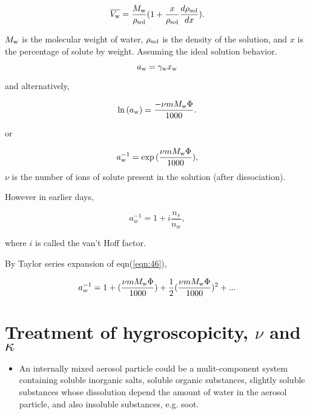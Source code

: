 \documentclass[12pt]{article}
\begin{document}
{\begin{equation}
\overline{V_{\rm w}}=\frac{ M_{\rm w}}{\rho_{\rm sol}} (1 + \frac{x}{\rho_{\rm sol}} \frac{d \rho_{\rm sol}}{dx}).
\end{equation}

$M_{\rm w}$ is the molecular weight of water, $\rho_{\rm sol}$ is the density of the solution, and $x$ is the percentage of solute by weight. Assuming the ideal solution behavior.

\begin{equation}
a_{\rm w}=\gamma_{\rm w} x_{\rm w}
\end{equation}

and alternatively, 

\begin{equation}
\ln {(a_{\rm w})}=\frac{- \nu m M_{\rm w} \Phi }{1000}.
\end{equation}

or 

\begin{equation}\label{eqn:46}
a_{\rm w}^{-1}=\exp{(\frac{\nu m M_{\rm w} \Phi }{1000})},
\end{equation}
$\nu$ is the number of ions of solute present in the solution (after dissociation). 

However in earlier days, 

\begin{equation}
a_{w}^{-1}=1+i \frac{n_{s}}{n_{w}},
\end{equation}

where $i$ is called the van't Hoff factor.

By Taylor series expansion of eqn(\ref{eqn:46}), 

\begin{equation}
a_{w}^{-1}=1+(\frac{\nu m M_{\rm w} \Phi }{1000})+\frac{1}{2}(\frac{\nu m M_{\rm w} \Phi }{1000})^{2}+...
\end{equation}


\section{Treatment of hygroscopicity, $\nu$ and $\kappa$}  
 
\begin{itemize}

\item An internally mixed aerosol particle could be a mulit-component system containing soluble inorganic salts, soluble organic substances, slightly soluble substances whose dissolution depend the amount of water in the aerosol particle, and also insoluble substances, e.g. soot.


\end{itemize}}
\end{document}

